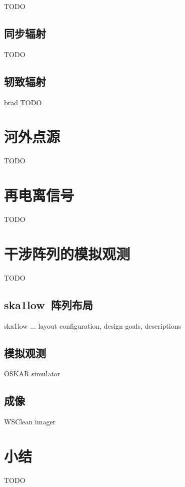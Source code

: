 TODO

\subsection{同步辐射}

TODO

\subsection{轫致辐射}

\acl{brad}
TODO


\section{河外点源}

TODO


\section{再电离信号}

TODO


\section{干涉阵列的模拟观测}

TODO

\subsection{\acs*{ska1low}~阵列布局}

\acl{ska1low} ...
layout configuration, design goals, descriptions

\subsection{模拟观测}

OSKAR simulator

\subsection{成像}
\label{ssec:imaging}

WSClean imager


\section{小结}

TODO


